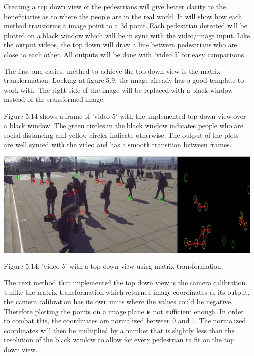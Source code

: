 \documentclass[12pt]{report}
\begin{document}
Creating a top down view of the pedestrians will give better clarity to the beneficiaries as to where the people are in the real world. It will show how each method transforms a image point to a 3d point. Each pedestrian detected will be plotted on a black window which will be in sync with the video/image input. Like the output videos, the top down will draw a line between pedestrians who are close to each other. All outputs will be done with 'video 5' for easy comparisons.

\vspace{2mm}

The first and easiest method to achieve the top down view is the matrix transformation. Looking at figure 5.9, the image already has a good template to work with. The right side of the image will be replaced with a black window instead of the transformed image.

\vspace{2mm}

Figure 5.14 shows a frame of 'video 5' with the implemented top down view over a black window. The green circles in the black window indicates people who are social distancing and yellow circles indicate otherwise. The output of the plots are well synced with the video and has a smooth transition between frames.
\begin{center}
	\includegraphics[width=150mm]{./images/appendix/BlackBoxMatrixTransformation.JPG}
	
	{\footnotesize Figure 5.14: 'video 5' with a top down view using matrix transformation.}
\end{center}

The next method that implemented the top down view is the camera calibration. Unlike the matrix transformation which returned image coordinates as its output, the camera calibration has its own units where the values could be negative. Therefore plotting the points on a image plane is not sufficient enough. In order to combat this, the coordinates are normalized between 0 and 1. The normalized coordinates will then be multiplied by a number that is slightly less than the resolution of the black window to allow for every pedestrian to fit on the top down view.
\end{document}
